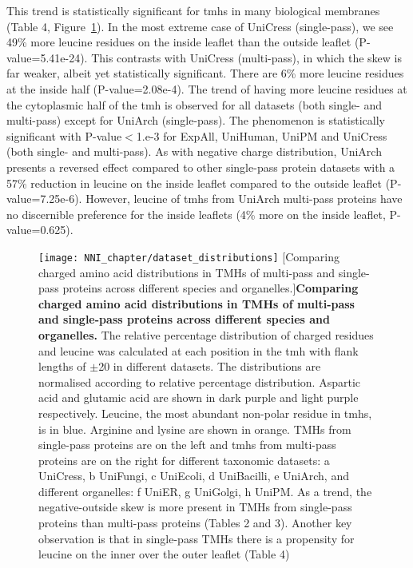 This trend is statistically significant for \gls{tmh}s in many biological membranes (Table 4, Figure~\ref{fig:dataset_distributions}).
In the most extreme case of UniCress (single-pass), we see 49\% more leucine residues on the inside leaflet than the outside leaflet (P-value=5.41e-24).
This contrasts with UniCress (multi-pass), in which the skew is far weaker, albeit yet statistically significant.
There are 6\% more leucine residues at the inside half (P-value=2.08e-4).
The trend of having more leucine residues at the cytoplasmic half of the \gls{tmh} is observed for all datasets (both single- and multi-pass) except for UniArch (single-pass).
The phenomenon is statistically significant with P-value$<$1.e-3 for ExpAll, UniHuman, UniPM and UniCress (both single- and multi-pass).
As with negative charge distribution, UniArch presents a reversed effect compared to other single-pass protein datasets with a 57\% reduction in leucine on the inside leaflet compared to the outside leaflet (P-value=7.25e-6).
However, leucine of \gls{tmh}s from UniArch multi-pass proteins have no discernible preference for the inside leaflets (4\% more on the inside leaflet, P-value=0.625).

\begin{figure}[!ht]
\centering
\texttt{[image: NNI\_chapter/dataset\_distributions]}
[Comparing charged amino acid distributions in TMHs of multi-pass and single-pass proteins across different species and organelles.]{\textbf{Comparing charged amino acid distributions in TMHs of multi-pass and single-pass proteins across different species and organelles.} The relative percentage distribution of charged residues and leucine was calculated at each position in the \gls{tmh} with flank lengths of $\pm$20 in different datasets.
The distributions are normalised according to relative percentage distribution.
Aspartic acid and glutamic acid are shown in dark purple and light purple respectively.
Leucine, the most abundant non-polar residue in \gls{tmh}s, is in blue.
Arginine and lysine are shown in orange.
TMHs from single-pass proteins are on the left and \gls{tmh}s from multi-pass proteins are on the right for different taxonomic datasets: a UniCress, b UniFungi, c UniEcoli, d UniBacilli, e UniArch, and different organelles: f UniER, g UniGolgi, h UniPM.
As a trend, the negative-outside skew is more present in TMHs from single-pass proteins than multi-pass proteins (Tables 2 and 3).
Another key observation is that in single-pass TMHs there is a propensity for leucine on the inner over the outer leaflet (Table 4)}


\label{fig:dataset_distributions}
\end{figure}

